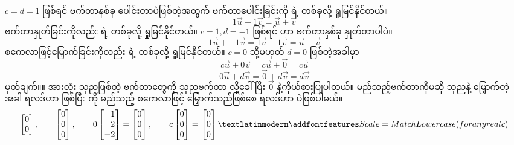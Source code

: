 $c = d = 1$ ဖြစ်ရင် ဗက်တာနှစ်ခု ပေါင်းတာပဲဖြစ်တဲ့အတွက် ဗက်တာပေါင်းခြင်းကို   ရဲ့  တစ်ခုလို့ ရှုမြင်နိုင်တယ်။
%
\[
1\vec{u} + 1\vec{v} =  \vec{u} + \vec{v} 
    \]
%
ဗက်တာနှုတ်ခြင်းကိုလည်း   ရဲ့  တစ်ခုလို့ ရှုမြင်နိုင်တယ်။ $c = 1, d = -1$ ဖြစ်ရင်  ဟာ ဗက်တာနှစ်ခု နှုတ်တာပါပဲ။
%
\[
1\vec{u} + -1\vec{v} =  1\vec{u} - 1\vec{v} = \vec{u} - \vec{v}
    \]
%
စကေလာဖြင့်မြှောက်ခြင်းကိုလည်း   ရဲ့  တစ်ခုလို့ ရှုမြင်နိုင်တယ်။ $c = 0$ သို့မဟုတ် $d = 0$ ဖြစ်တဲ့အခါမှာ
%
\[
c\vec{u} + 0\vec{v} =  c\vec{u} + \vec{0} = c\vec{u}
    \]
\[
0\vec{u} + d\vec{v} =  \vec{0} + d\vec{v} = d\vec{v}
    \]
%
မှတ်ချက်။\qquad ။  အားလုံး သုညဖြစ်တဲ့ ဗက်တာတွေကို သုညဗက်တာ  လို့ခေါ်ပြီး $\vec{0}$ နဲ့ကိုယ်စားပြုပါတယ်။ မည်သည့်ဗက်တာကိုမဆို သုညနဲ့ မြှောက်တဲ့အခါ ရလဒ်ဟာ  ဖြစ်ပြီး  ကို မည်သည့် စကေလာဖြင့် မြှောက်သည်ဖြစ်စေ ရလဒ်ဟာ  ပဲဖြစ်ပါမယ်။ 
%
\[\begin{bmatrix*}[r] 0\\ 0\\\end{bmatrix*}, \qquad
\begin{bmatrix*}[r] 0\\ 0\\ 0\\\end{bmatrix*}, \qquad
0\begin{bmatrix*}[r] 1\\ 2\\ -2\\\end{bmatrix*} = 
    \begin{bmatrix*}[r] 0\\ 0\\ 0\\\end{bmatrix*}, \qquad
c\begin{bmatrix*}[r] 0\\ 0\\ 0\\\end{bmatrix*} = \begin{bmatrix*}[r] 0\\ 0\\ 0\\\end{bmatrix*} \fEn{ (for any real } c)\] 
%

